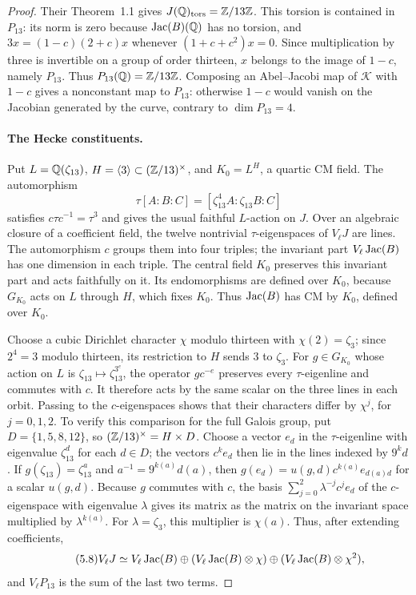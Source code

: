 \begin{proof}
Their Theorem~1.1 gives $J(\mathbb Q)_{\rm tors}=\mathbb Z/13\mathbb Z$.
This torsion is contained in $P_{13}$: its norm is zero because
$\operatorname{Jac}(B)(\mathbb Q)$ has no torsion, and
$3x=(1-c)(2+c)x$ whenever $(1+c+c^2)x=0$.
Since multiplication by three is invertible on a group of order
thirteen, $x$ belongs to the image of $1-c$, namely $P_{13}$.
Thus $P_{13}(\mathbb Q)=\mathbb Z/13\mathbb Z$.
Composing an Abel--Jacobi map of $\mathcal K$ with $1-c$ gives a
nonconstant map to $P_{13}$: otherwise $1-c$ would vanish on the
Jacobian generated by the curve, contrary to $\dim P_{13}=4$.

\paragraph{The Hecke constituents.}
Put $L=\mathbb Q(\zeta_{13})$, $H=\langle3\rangle\subset(\mathbb Z/13)^\times$,
and $K_0=L^H$, a quartic CM field. The automorphism
\[
 \tau[A:B:C]=[\zeta_{13}^4 A:\zeta_{13}B:C]
\]
satisfies $c\tau c^{-1}=\tau^3$ and gives the usual faithful
$L$-action on $J$. Over an algebraic closure of a coefficient field,
the twelve nontrivial $\tau$-eigenspaces of $V_\ell J$ are lines.
The automorphism $c$ groups them into four triples; the invariant
part $V_\ell\operatorname{Jac}(B)$ has one dimension in each triple.
The central field $K_0$ preserves this invariant part and acts
faithfully on it. Its endomorphisms are defined over $K_0$, because
$G_{K_0}$ acts on $L$ through $H$, which fixes $K_0$.
Thus $\operatorname{Jac}(B)$ has CM by $K_0$, defined over $K_0$.

Choose a cubic Dirichlet character $\chi$ modulo thirteen with
$\chi(2)=\zeta_3$; since $2^4=3$ modulo thirteen, its restriction
to $H$ sends $3$ to $\zeta_3$.
For $g\in G_{K_0}$ whose action on $L$ is $\zeta_{13}\mapsto
\zeta_{13}^{3^e}$, the operator $gc^{-e}$ preserves every
$\tau$-eigenline and commutes with $c$. It therefore acts by the
same scalar on the three lines in each orbit. Passing to the
$c$-eigenspaces shows that their characters differ by $\chi^j$,
for $j=0,1,2$.
To verify this comparison for the full Galois group, put
$D=\{1,5,8,12\}$, so $(\mathbb Z/13)^\times=H\times D$.
Choose a vector $e_d$ in the $\tau$-eigenline with eigenvalue
$\zeta_{13}^d$ for each $d\in D$; the vectors $c^ke_d$
then lie in the lines indexed by $9^kd$.
If $g(\zeta_{13})=\zeta_{13}^a$ and
$a^{-1}=9^{k(a)}d(a)$, then
$g(e_d)=u(g,d)c^{k(a)}e_{d(a)d}$ for a scalar $u(g,d)$.
Because $g$ commutes with $c$, the basis
$\sum_{j=0}^2\lambda^{-j}c^je_d$ of the $c$-eigenspace
with eigenvalue $\lambda$ gives its matrix as the matrix on the
invariant space multiplied by $\lambda^{k(a)}$.
For $\lambda=\zeta_3$, this multiplier is $\chi(a)$.
Thus, after extending coefficients,
\begin{equation}\tag{5.8}\label{eq:thirteen-twists}
 V_\ell J\simeq V_\ell\operatorname{Jac}(B)\oplus
 (V_\ell\operatorname{Jac}(B)\otimes\chi)\oplus
 (V_\ell\operatorname{Jac}(B)\otimes\chi^2),
\end{equation}
and $V_\ell P_{13}$ is the sum of the last two terms.


\end{proof}
